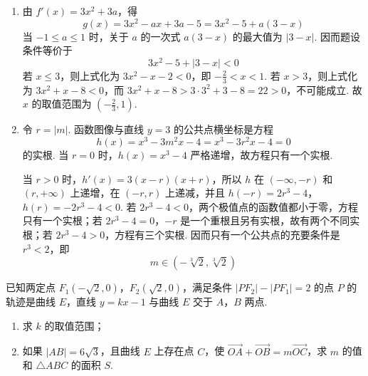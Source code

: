 \begin{solution}
\begin{enumerate}
\item 由 \(f'(x)=3x^2+3a\)，得
\[
g(x)=3x^2-ax+3a-5=3x^2-5+a(3-x)
\]
当 \(-1\leqslant a\leqslant1\) 时，关于 \(a\) 的一次式 \(a(3-x)\) 的最大值为 \(\lvert 3-x\rvert\). 因而题设条件等价于
\[
3x^2-5+\lvert 3-x\rvert<0
\]
若 \(x\leqslant3\)，则上式化为 \(3x^2-x-2<0\)，即 \(-\frac{2}{3}<x<1\). 若 \(x>3\)，则上式化为
\(3x^2+x-8<0\)，而 \(3x^2+x-8>3\cdot3^2+3-8=22>0\)，不可能成立. 故 \(x\) 的取值范围为
\(\left(-\frac{2}{3},1\right)\).

\item 令 \(r=\lvert m\rvert\). 函数图像与直线 \(y=3\) 的公共点横坐标是方程
\[
h(x)=x^3-3m^2x-4=x^3-3r^2x-4=0
\]
的实根. 当 \(r=0\) 时，\(h(x)=x^3-4\) 严格递增，故方程只有一个实根.

当 \(r>0\) 时，\(h'(x)=3(x-r)(x+r)\)，所以 \(h\) 在 \((-\infty,-r)\) 和 \((r,+\infty)\) 上递增，在 \((-r,r)\) 上递减，并且
\(h(-r)=2r^3-4\)，\(h(r)=-2r^3-4<0\).
若 \(2r^3-4<0\)，两个极值点的函数值都小于零，方程只有一个实根；若 \(2r^3-4=0\)，\(-r\) 是一个重根且另有实根，故有两个不同实根；若 \(2r^3-4>0\)，方程有三个实根. 因而只有一个公共点的充要条件是 \(r^3<2\)，即
\[
m\in\left(-\sqrt[3]{2},\sqrt[3]{2}\right)
\]
\end{enumerate}
\end{solution}

\begin{problem}
已知两定点 \(F_{1}(-\sqrt{2},0)\)，\(F_{2}(\sqrt{2},0)\)，满足条件 \(\left|PF_{2}\right| - \left|PF_{1}\right| = 2\) 的点 \(P\) 的轨迹是曲线 \(E\)，直线 \(y = kx - 1\) 与曲线 \(E\) 交于 \(A\)，\(B\) 两点.

\begin{enumerate}
\item 求 \(k\) 的取值范围；
\item 如果 \(\left|AB\right|=6\sqrt{3}\)，且曲线 \(E\) 上存在点 \(C\)，使 \(\overrightarrow{OA}+\overrightarrow{OB}=m\overrightarrow{OC}\)，求 \(m\) 的值和 \(\triangle ABC\) 的面积 \(S\).
\end{enumerate}
\end{problem}

